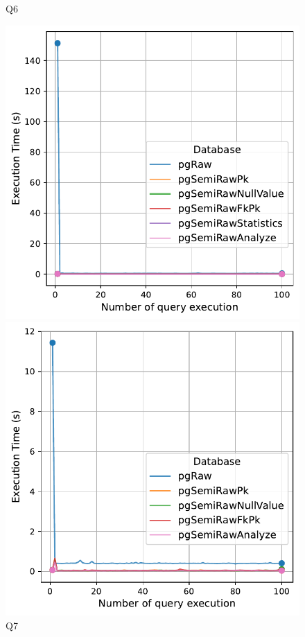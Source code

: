 \begin{figure}[h!]
\begin{minipage}[b]{0.45\linewidth}
    \caption*{Q6}
\end{minipage}
\vspace{0.5cm}
\begin{minipage}[b]{0.45\linewidth}
    \centering
    \includegraphics[width=1.0\linewidth]{charts-eval-exp-time/execution_time_db_type_Q7.pdf}
    \caption*{Q7}
\end{minipage}
\hfill
\begin{minipage}[b]{0.45\linewidth}
    \centering
    \includegraphics[width=1.0\linewidth]{charts-eval-exp-time/execution_time_db_type_Q9.pdf}

\end{minipage}
\end{figure}
